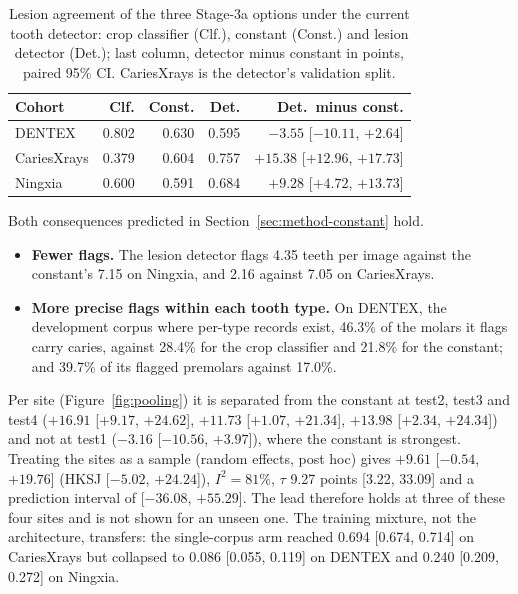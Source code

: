 \begin{table}[!htbp]
\centering
\caption[Lesion agreement of the three caries options]{Lesion agreement of the three Stage-3a options
under the current tooth detector: crop classifier (Clf.), constant (Const.) and lesion detector (Det.);
last column, detector minus constant in points, paired 95\% CI. CariesXrays is the detector's
validation split.}
\label{tab:arms}
\small
\begin{tabular}{@{}lrrrr@{}}
\toprule
Cohort & Clf. & Const. & Det. & Det.\ minus const.\\
\midrule
DENTEX & 0.802 & 0.630 & 0.595 & $-3.55$ [$-10.11$, $+2.64$]\\
CariesXrays & 0.379 & 0.604 & 0.757 & $+15.38$ [$+12.96$, $+17.73$]\\
Ningxia & 0.600 & 0.591 & 0.684 & $+9.28$ [$+4.72$, $+13.73$]\\
\bottomrule
\end{tabular}
\end{table}

Both consequences predicted in Section~\ref{sec:method-constant} hold.
\begin{itemize}
\item \textbf{Fewer flags.} The lesion detector flags 4.35 teeth per image against the constant's 7.15
  on Ningxia, and 2.16 against 7.05 on CariesXrays.
\item \textbf{More precise flags within each tooth type.} On DENTEX, the development corpus where
  per-type records exist, 46.3\% of the molars it flags carry caries, against 28.4\% for the crop
  classifier and 21.8\% for the constant; and 39.7\% of its flagged premolars against 17.0\%.
\end{itemize}
Per site (Figure~\ref{fig:pooling}) it is separated from the constant at test2, test3 and test4 ($+16.91$
[$+9.17$, $+24.62$], $+11.73$ [$+1.07$, $+21.34$], $+13.98$ [$+2.34$, $+24.34$]) and not at test1 ($-3.16$
[$-10.56$, $+3.97$]), where the constant is strongest. Treating the sites as a sample (random effects,
post hoc) gives $+9.61$ [$-0.54$, $+19.76$] (HKSJ [$-5.02$, $+24.24$]), $I^2 = 81\%$, $\tau$ 9.27 points
[3.22, 33.09] and a prediction interval of [$-36.08$, $+55.29$]. The lead therefore holds at three of
these four sites and is not shown for an unseen one. The training mixture, not the architecture,
transfers: the single-corpus arm reached 0.694 [0.674, 0.714] on CariesXrays but collapsed to 0.086
[0.055, 0.119] on DENTEX and 0.240 [0.209, 0.272] on Ningxia. %


